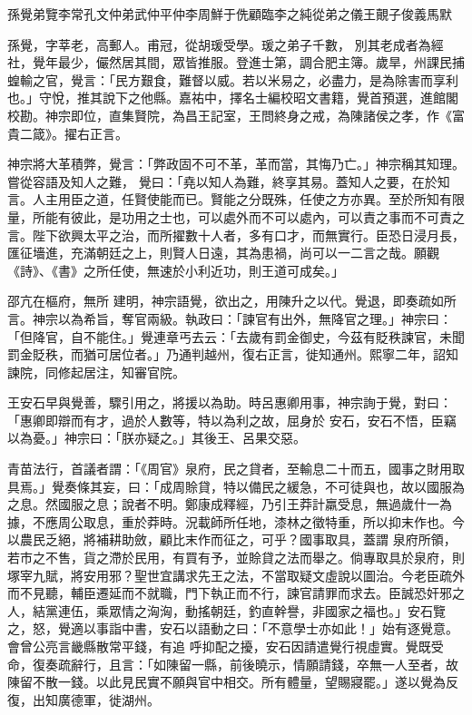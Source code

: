 
\begin{pinyinscope}

 孫覺弟覽李常孔文仲弟武仲平仲李周鮮于侁顧臨李之純從弟之儀王覿子俊義馬默



 孫覺，字莘老，高郵人。甫冠，從胡瑗受學。瑗之弟子千數，
 別其老成者為經社，覺年最少，儼然居其間，眾皆推服。登進士第，調合肥主簿。歲旱，州課民捕蝗輸之官，覺言：「民方艱食，難督以威。若以米易之，必盡力，是為除害而享利也。」守悅，推其說下之他縣。嘉祐中，擇名士編校昭文書籍，覺首預選，進館閣校勘。神宗即位，直集賢院，為昌王記室，王問終身之戒，為陳諸侯之孝，作《富貴二箴》。擢右正言。



 神宗將大革積弊，覺言：「弊政固不可不革，革而當，其悔乃亡。」神宗稱其知理。嘗從容語及知人之難，
 覺曰：「堯以知人為難，終享其易。蓋知人之要，在於知言。人主用臣之道，任賢使能而已。賢能之分既殊，任使之方亦異。至於所知有限量，所能有彼此，是功用之士也，可以處外而不可以處內，可以責之事而不可責之言。陛下欲興太平之治，而所擢數十人者，多有口才，而無實行。臣恐日浸月長，匯征墻進，充滿朝廷之上，則賢人日遠，其為患禍，尚可以一二言之哉。願觀《詩》、《書》之所任使，無速於小利近功，則王道可成矣。」



 邵亢在樞府，無所
 建明，神宗語覺，欲出之，用陳升之以代。覺退，即奏疏如所言。神宗以為希旨，奪官兩級。執政曰：「諫官有出外，無降官之理。」神宗曰：「但降官，自不能住。」覺連章丐去云：「去歲有罰金御史，今茲有貶秩諫官，未聞罰金貶秩，而猶可居位者。」乃通判越州，復右正言，徙知通州。熙寧二年，詔知諫院，同修起居注，知審官院。



 王安石早與覺善，驟引用之，將援以為助。時呂惠卿用事，神宗詢于覺，對曰：「惠卿即辯而有才，過於人數等，特以為利之故，屈身於
 安石，安石不悟，臣竊以為憂。」神宗曰：「朕亦疑之。」其後王、呂果交惡。



 青苗法行，首議者謂：「《周官》泉府，民之貸者，至輸息二十而五，國事之財用取具焉。」覺奏條其妄，曰：「成周賒貸，特以備民之緩急，不可徒與也，故以國服為之息。然國服之息；說者不明。鄭康成釋經，乃引王莽計羸受息，無過歲什一為據，不應周公取息，重於莽時。況載師所任地，漆林之徵特重，所以抑末作也。今以農民乏絕，將補耕助斂，顧比末作而征之，可乎？國事取具，蓋謂
 泉府所領，若市之不售，貨之滯於民用，有買有予，並賒貸之法而舉之。倘專取具於泉府，則塚宰九賦，將安用邪？聖世宜講求先王之法，不當取疑文虛說以圖治。今老臣疏外而不見聽，輔臣遷延而不就職，門下執正而不行，諫官請罪而求去。臣誠恐奸邪之人，結黨連伍，乘眾情之洶洶，動搖朝廷，釣直幹譽，非國家之福也。」安石覽之，怒，覺適以事詣中書，安石以語動之曰：「不意學士亦如此！」始有逐覺意。會曾公亮言畿縣散常平錢，有追
 呼抑配之擾，安石因請遣覺行視虛實。覺既受命，復奏疏辭行，且言：「如陳留一縣，前後曉示，情願請錢，卒無一人至者，故陳留不散一錢。以此見民實不願與官中相交。所有體量，望賜寢罷。」遂以覺為反復，出知廣德軍，徙湖州。




\end{pinyinscope}
